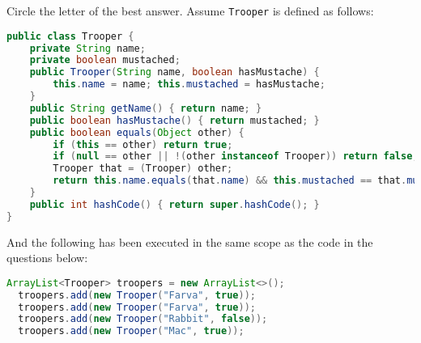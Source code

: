 \documentclass[addpoints,9pt]{exam}
\begin{document}
\begin{questions}
 Circle the letter of the best answer. Assume {\tt Trooper} is defined as follows:
\begin{lstlisting}[language=Java]
public class Trooper {
    private String name;
    private boolean mustached;
    public Trooper(String name, boolean hasMustache) {
        this.name = name; this.mustached = hasMustache;
    }
    public String getName() { return name; }
    public boolean hasMustache() { return mustached; }
    public boolean equals(Object other) {
        if (this == other) return true;
        if (null == other || !(other instanceof Trooper)) return false;
        Trooper that = (Trooper) other;
        return this.name.equals(that.name) && this.mustached == that.mustached;
    }
    public int hashCode() { return super.hashCode(); }
}
\end{lstlisting}
And the following has been executed in the same scope as the code in the questions below:
\begin{lstlisting}[language=Java]
  ArrayList<Trooper> troopers = new ArrayList<>();
  troopers.add(new Trooper("Farva", true));
  troopers.add(new Trooper("Farva", true));
  troopers.add(new Trooper("Rabbit", false));
  troopers.add(new Trooper("Mac", true));
\end{lstlisting}

\end{questions}
\end{document}
